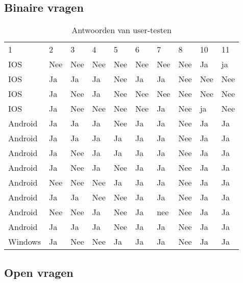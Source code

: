 \subsection{Binaire vragen}
	\begin{table}[H]
		\centering
		\begin{tabular}{llllllllll}
			1 &  2 & 3 & 4 & 5 & 6 & 7 & 8 & 10 &11\\
			IOS & Nee & Nee & Nee & Nee & Nee & Nee & Nee & Ja & ja \\
			IOS & Ja & Ja & Ja & Nee & Ja & Ja & Nee & Nee & Nee \\
			IOS & Ja & Nee & Ja & Nee & Nee & Nee & Nee & Nee & Nee \\
			IOS & Ja & Nee & Nee & Nee & Nee & Ja & Nee & ja & Nee \\
			Android & Ja & Ja & Ja & Nee & Ja & Ja & Nee & Ja & Ja \\
			Android & Ja & Ja & Ja & Ja & Ja & Ja & Nee & Ja & Ja \\
			Android & Ja & Nee & Ja & Ja & Ja & Ja & Nee & Ja & Ja \\
			Android & Ja & Nee & Ja & Nee & Ja & Ja & Nee & Ja & Ja \\
			Android & Nee & Nee & Nee & Ja & Ja & Ja & Nee & Ja & Ja \\
			Android & Ja & Ja & Nee & Nee & Ja & Ja & Nee & Ja & Ja \\
			Android & Nee & Nee & Ja & Nee & Ja & nee & Nee & Ja & Ja \\
			Android & Ja & Ja & Ja & Nee & Ja & Ja & Nee & Ja & Ja \\
			Windows & Ja & Nee & Nee & Ja & Ja & Ja & Nee & Ja & Ja \\
		\end{tabular}	
		\caption{Antwoorden van user-testen}
	\end{table}
	
\subsection{Open vragen}
